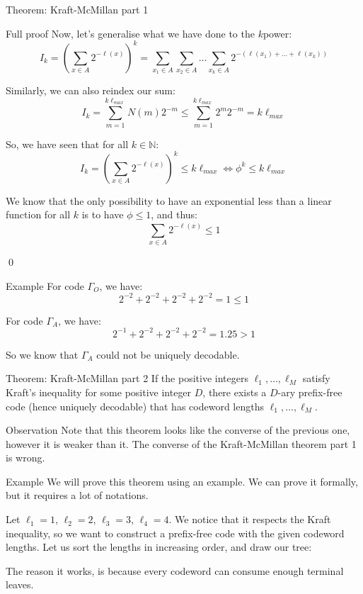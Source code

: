 \documentclass[a4paper]{article}
\begin{document}
\begin{parag}{Theorem: Kraft-McMillan part 1}
\begin{subparag}{Full proof}
        Now, let's generalise what we have done to the $k$\Th power: 
        \[I_k = \left(\sum_{x \in A}^{} 2^{-\ell\left(x\right)}\right)^k = \sum_{x_1 \in A}^{} \sum_{x_2 \in A}^{} \ldots \sum_{x_k \in A}^{} 2^{-\left(\ell\left(x_1\right) + \ldots + \ell\left(x_k\right)\right)} \]

        Similarly, we can also reindex our sum: 
        \[I_k = \sum_{m=1}^{k \ell_{max}} N\left(m\right) 2^{-m} \leq \sum_{m=1}^{k \ell_{max}} 2^{m} 2^{-m} = k \ell_{max}\]
        
        So, we have seen that for all $k \in \mathbb{N}$: 
        \[I_k = \left(\sum_{x \in A}^{} 2^{-\ell\left(x\right)}\right)^{k} \leq k \ell_{max} \iff \phi^k \leq k \ell_{max}\]

        We know that the only possibility to have an exponential less than a linear function for all $k$ is to have $\phi \leq 1$, and thus: 
        \[\sum_{x \in A}^{} 2^{-\ell\left(x\right)} \leq 1\]
        
        \qed
    \end{subparag}
    
\end{parag}

\begin{parag}{Example}
    For code $\Gamma_O$, we have: 
    \[2^{-2} + 2^{-2} + 2^{-2} + 2^{-2} = 1 \leq 1\]

    For code $\Gamma_A$, we have: 
    \[2^{-1} + 2^{-2} + 2^{-2} + 2^{-2} = 1.25 > 1\]

    So we know that $\Gamma_A$ could not be uniquely decodable. 
\end{parag}

\begin{parag}{Theorem: Kraft-McMillan part 2}
    If the positive integers $\ell_1, \ldots, \ell_M$ satisfy Kraft's inequality for some positive integer $D$, there exists a $D$-ary prefix-free code (hence uniquely decodable) that has codeword lengths $\ell_1, \ldots, \ell_M$.

    \begin{subparag}{Observation}
        Note that this theorem looks like the converse of the previous one, however it is weaker than it. The converse of the Kraft-McMillan theorem part 1 is wrong.
    \end{subparag}

    \begin{subparag}{Example}
        We will prove this theorem using an example. We can prove it formally, but it requires a lot of notations. 

        Let $\ell_1 = 1$, $\ell_2 = 2$, $\ell_3 = 3$, $\ell_4 = 4$. We notice that it respects the Kraft inequality, so we want to construct a prefix-free code with the given codeword lengths. Let us sort the lengths in increasing order, and draw our tree:

        The reason it works, is because every codeword can consume enough terminal leaves.
    \end{subparag}
\end{parag}
\end{document}

